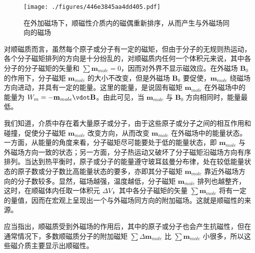 
\begin{figure}[ht]
\centering
\texttt{[image: ./figures/446e3845aa4dd405.pdf]}
\caption{在外加磁场下，顺磁性介质内的磁偶重新排序，从而产生与外磁场同向的磁场} \label{fig_ParaMa_1}
\end{figure}

对顺磁质而言，虽然每个原子或分子有一定的磁矩，但由于分子的无规则热运动，各个分子磁矩排列的方向是十分纷乱的，对顺磁质内任何一个体积元来说，其中各分子的分子磁矩的矢量和 $\sum \mathbf{m}_{mole}=0$，因而对外界不显示磁效应。在外磁场 $\mathbf B_0$ 的作用下，分子磁矩 $\mathbf{m}_{mole}$ 的大小不改变，但是外磁场 $\mathbf B_0$ 要促使，$\mathbf{m}_{mole}$ 绕磁场方向进动，并具有一定的能量。这里的能量，是说固有磁矩 $\mathbf m_{mole}$ 在外磁场中的能量为 $W_m=-\mathbf m_{mole} \vdot \mathbf B$。由此可见，当 $\mathbf m_{mole}$ 与 $\mathbf B_0$ 方向相同时，能量最低。

我们知道，介质中存在着大量原子或分子，由于这些原子或分子之间的相互作用和碰撞，促使分子磁矩 $\mathbf m_{mole}$ 改变方向，从而改变 $\mathbf m_{mole}$ 在外磁场中的能量状态。一方面，从能量的角度来看，分子磁矩尽可能要处于低的能量状态，即 $\mathbf m_{mole}$ 与外磁场方向一致的状态；另一方面，分子热运动又破坏了分子磁矩沿磁场方向有序排列。当达到热平衡时，原子或分子的能量遵守玻耳兹曼分布律，处在较低能量状态的原子数或分子数比高能量状态的要多，亦即其分子磁矩 $\mathbf m_{mole}$ 靠近外磁场方向的分子数较多。显然，磁场越强，温度越低，分子磁矩 $\mathbf m_{mole}$ 排列也越整齐，这时，在顺磁体内任取一体积元 $\Delta V$，其中各分子磁矩的矢量 $\sum \mathbf m_{mole}$ 将有一定的量值，因而在宏观上呈现出一个与外磁场同方向的附加磁场。这就是顺磁性的来源。

应当指出，顺磁质受到外磁场的作用后，其中的原子或分子也会产生抗磁性，但在通常情况下，多数顺磁质分子的附加磁矩 $\sum \Delta\mathbf m_{mole}$ 比 $\sum \mathbf m_{mole}$ 小很多，所以这些磁介质主要显示出顺磁性。